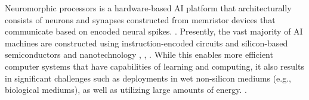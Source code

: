\documentclass[twocolumn]{biophys-new}
\begin{document}
{{\begin{figure}[ht!]
{%
}
\label{fig:abstract_fig}
\vspace{-0.5em}
\end{figure}

Neuromorphic processors is a hardware-based AI platform that architecturally consists of neurons and synapses constructed from memristor devices that communicate  based on encoded neural spikes. \cite{schuman2022opportunities}.  
Presently, the vast majority of AI machines are constructed using instruction-encoded circuits and silicon-based semiconductors and nanotechnology \cite{nesbeth2016synthetic}, \cite{akan2016fundamentals}, \cite{akan2023internet}. While this enables more efficient computer systems that have capabilities of learning and computing, it also results in significant challenges such as deployments in wet non-silicon mediums (e.g., biological mediums), as well as utilizing large amounts of energy. %
\cite{schwenk2005training}. 



}}
\end{document}
